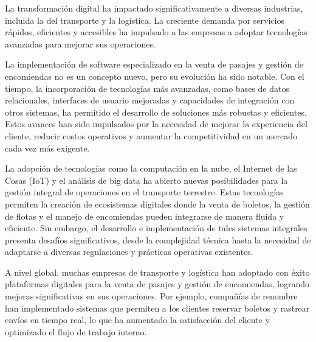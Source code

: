 	La transformación digital ha impactado significativamente a diversas industrias, incluida la del transporte y la logística. La creciente demanda por servicios rápidos, eficientes y accesibles ha impulsado a las empresas a adoptar tecnologías avanzadas para mejorar sus operaciones.
	
	La implementación de software especializado en la venta de pasajes y gestión de encomiendas no es un concepto nuevo, pero su evolución ha sido notable. Con el tiempo, la incorporación de tecnologías más avanzadas, como bases de datos relacionales, interfaces de usuario mejoradas y capacidades de integración con otros sistemas, ha permitido el desarrollo de soluciones más robustas y eficientes. Estos avances han sido impulsados por la necesidad de mejorar la experiencia del cliente, reducir costos operativos y aumentar la competitividad en un mercado cada vez más exigente.
		
	
	La adopción de tecnologías como la computación en la nube, el Internet de las Cosas (IoT) y el análisis de big data ha abierto nuevas posibilidades para la gestión integral de operaciones en el transporte terrestre. Estas tecnologías permiten la creación de ecosistemas digitales donde la venta de boletos, la gestión de flotas y el manejo de encomiendas pueden integrarse de manera fluida y eficiente. Sin embargo, el desarrollo e implementación de tales sistemas integrales presenta desafíos significativos, desde la complejidad técnica hasta la necesidad de adaptarse a diversas regulaciones y prácticas operativas existentes.
	
	A nivel global, muchas empresas de transporte y logística han adoptado con éxito plataformas digitales para la venta de pasajes y gestión de encomiendas, logrando mejoras significativas en sus operaciones. Por ejemplo, compañías de renombre han implementado sistemas que permiten a los clientes reservar boletos y rastrear envíos en tiempo real, lo que ha aumentado la satisfacción del cliente y optimizado el flujo de trabajo interno.
	
